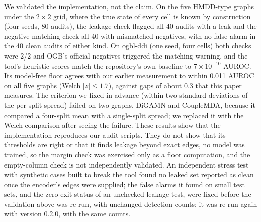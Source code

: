 \documentclass[review]{elsarticle}
\begin{document}
We validated the implementation, not the claim. On the five HMDD-type graphs under the $2\times2$ grid,
where the true state of every cell is known by construction (four seeds, 80 audits), the leakage check
flagged all 40 audits with a leak and the negative-matching check all 40 with mismatched negatives, with no
false alarm in the 40 clean audits of either kind. On ogbl-ddi (one seed, four cells) both checks were
2/2 and OGB's official negatives triggered the matching warning, and the tool's heuristic scores match the
repository's own baseline to $7\times10^{-10}$ AUROC. Its model-free floor agrees with our earlier
measurement to within 0.011 AUROC on all five graphs (Welch $|z|\le1.7$), against gaps of about 0.3 that this
paper measures. The criterion we fixed in advance (within two standard deviations of the per-split spread)
failed on two graphs, DiGAMN and CoupleMDA, because it compared a four-split mean with a single-split
spread; we replaced it with the Welch comparison after seeing the failure. These results show that the
implementation reproduces our audit scripts. They do not show that its thresholds are right or that it finds
leakage beyond exact edges, no model was trained, so the margin check was exercised only as a floor
computation, and the empty-column check is not independently validated. An independent stress test with
synthetic cases built to break the tool found no leaked set reported as clean once the encoder's edges were
supplied; the false alarms it found on small test sets, and the zero exit status of an unchecked leakage
test, were fixed before the validation above was re-run, with unchanged detection counts; it was re-run again with version 0.2.0, with the same counts.
\end{document}
